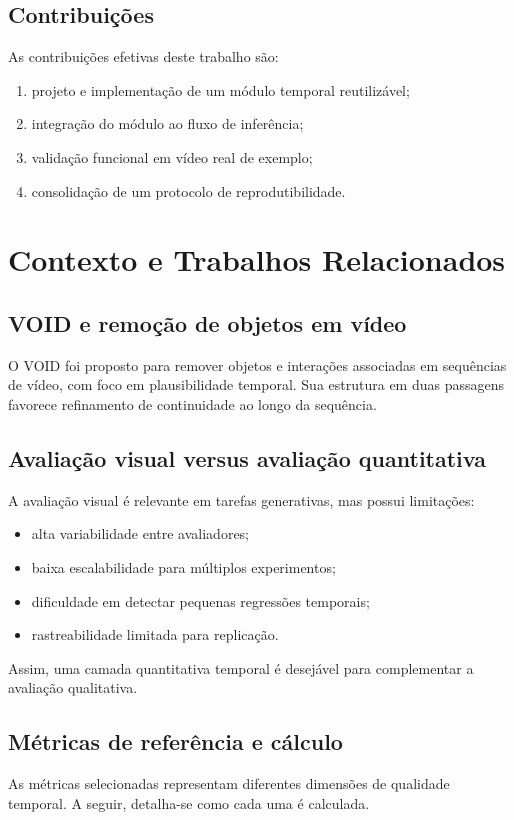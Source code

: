 \documentclass[conference]{IEEEtran}
\begin{document}
\subsection{Contribuições}
As contribuições efetivas deste trabalho são:
\begin{enumerate}
    \item projeto e implementação de um módulo temporal reutilizável;
    \item integração do módulo ao fluxo de inferência;
    \item validação funcional em vídeo real de exemplo;
    \item consolidação de um protocolo de reprodutibilidade.
\end{enumerate}

\section{Contexto e Trabalhos Relacionados}
\subsection{VOID e remoção de objetos em vídeo}
O VOID foi proposto para remover objetos e interações associadas em sequências de vídeo, com foco em plausibilidade temporal. Sua estrutura em duas passagens favorece refinamento de continuidade ao longo da sequência.

\subsection{Avaliação visual versus avaliação quantitativa}
A avaliação visual é relevante em tarefas generativas, mas possui limitações:
\begin{itemize}
    \item alta variabilidade entre avaliadores;
    \item baixa escalabilidade para múltiplos experimentos;
    \item dificuldade em detectar pequenas regressões temporais;
    \item rastreabilidade limitada para replicação.
\end{itemize}

Assim, uma camada quantitativa temporal é desejável para complementar a avaliação qualitativa.

\subsection{Métricas de referência e cálculo}
As métricas selecionadas representam diferentes dimensões de qualidade temporal. A seguir, detalha-se como cada uma é calculada.
\end{document}
